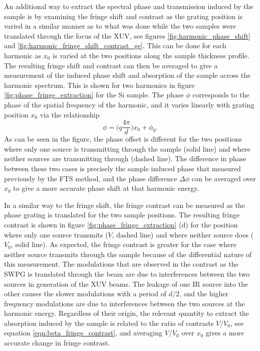 An additional way to extract the spectral phase and transmission induced by the sample is by examining the fringe shift and contrast as the grating position is varied in a similar manner as to what was done while the two samples were translated through the focus of the XUV, see figures \ref{fig:harmonic_phase_shift} and \ref{fig:harmonic_fringe_shift_contrast_ge}.  This can be done for each harmonic as $x_0$ is varied at the two positions along the sample thickness profile.  The resulting fringe shift and contrast can then be averaged to give a measurement of the induced phase shift and absorption of the sample across the harmonic spectrum.  This is shown for two harmonics in figure \ref{fig:phase_fringe_extraction} for the Si sample.  The phase $\phi$ corresponds to the phase of the spatial frequency of the harmonic, and it varies linearly with grating position $x_0$ via the relationship
\begin{equation}
	\phi=\bigg(q\frac{4\pi}{d}\bigg)x_0 + \phi_0.
\end{equation} 
As can be seen in the figure, the phase offset is different for the two positions where only one source is transmitting through the sample (solid line) and where neither sources are transmitting through (dashed line).  The difference in phase between these two cases is precisely the sample induced phase that measured previously by the FTS method, and the phase difference $\Delta\phi$ can be averaged over $x_0$ to give a more accurate phase shift at that harmonic energy. 

In a similar way to the fringe shift, the fringe contrast can be measured as the phase grating is translated for the two sample positions. The resulting fringe contrast is shown in figure \ref{fig:phase_fringe_extraction} (d) for the position where only one source transmits ($V$, dashed line) and where neither source does ($V_0$, solid line).  As expected, the fringe contrast is greater for the case where neither source transmits through the sample because of the differential nature of this measurement.  The modulations that are observed in the contrast as the SWPG is translated through the beam are due to interferences between the two sources in generation of the XUV beams.  The leakage of one IR source into the other causes the slower modulations with a period of $d/2$, and the higher frequency modulations are due to interferences between the two sources at the harmonic energy.  Regardless of their origin, the relevant quantity to extract the absorption induced by the sample is related to the ratio of contrasts $V/V_0$, see equation \ref{eqn:beta_fringe_contrast}, and averaging $V/V_0$ over $x_0$ gives a more accurate change in fringe contrast. 


